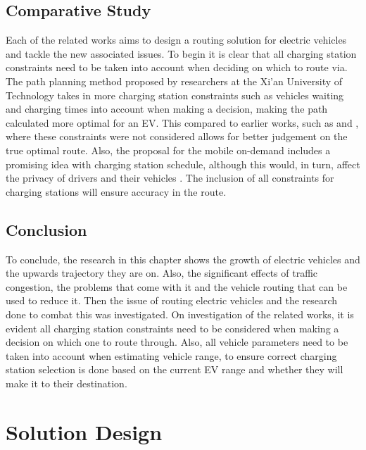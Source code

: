 \documentclass[11pt]{report}
\begin{document}
\section{Comparative Study}

Each of the related works aims to design a routing solution for electric vehicles and tackle the new associated issues. To begin it is clear that all charging station constraints need to be taken into account when deciding on which to route via. The path planning method proposed by researchers at the Xi’an University of Technology \autocite{sparkEVChargingDing} takes in more charging station constraints such as vehicles waiting and charging times into account when making a decision, making the path calculated more optimal for an EV. This compared to earlier works, such as \autocite{kobayashi2011route} and \autocite{bellmanFordRouting}, where these constraints were not considered allows for better judgement on the true optimal route. Also, the proposal for the mobile on-demand includes a promising idea with charging station schedule, although this would, in turn, affect the privacy of drivers and their vehicles \autocite{inRouteOptimalAmmous}. The inclusion of all constraints for charging stations will ensure accuracy in the route.

\section{Conclusion}

To conclude, the research in this chapter shows the growth of electric vehicles and the upwards trajectory they are on. Also, the significant effects of traffic congestion, the problems that come with it and the vehicle routing that can be used to reduce it. Then the issue of routing electric vehicles and the research done to combat this was investigated. On investigation of the related works, it is evident all charging station constraints need to be considered when making a decision on which one to route through. Also, all vehicle parameters need to be taken into account when estimating vehicle range, to ensure correct charging station selection is done based on the current EV range and whether they will make it to their destination.

\newpage

\chapter{Solution Design}
\end{document}
